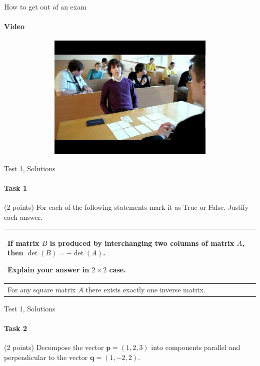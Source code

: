 \documentclass[aspectratio=169]{beamer}
\begin{document}
\begin{frame}[t]{How to get out of an exam}
    \framesubtitle{Video}
    \vspace{-0.6cm}
    \begin{figure}[H]
        \href{https://youtu.be/eiLF4zRA634}{
            \centering\includegraphics[height=6cm,width=1\textwidth,keepaspectratio]{meme.jpg}}
        \label{fig:meme.jpg}
    \end{figure}
\end{frame}

\begin{frame}[t]{Test 1, Solutions}
\framesubtitle{Task 1}
(2 points) For each of the following statements mark it as True or False. Justify each answer.
\smallskip


\begin{enumerate}

\begin{tabular}[b]{p{10cm}|p{2cm}}

\hline
   \item  If matrix $B$ is produced by interchanging two columns of matrix $A$, then $\det (B) = -\det (A) $. 
   
   Explain your answer in $2\times 2$ case. &    \\ 
    \hline
    \item For any square matrix $A$ there exists exactly one inverse matrix. & \\
    \hline
    \end{tabular}
\end{enumerate}
\end{frame}

\begin{frame}[t]{Test 1, Solutions}
\framesubtitle{Task 2}
(2 points) Decompose the vector $\textbf{p} = (1, 2, 3)$ into components parallel and perpendicular to the vector $\textbf{q} = (1, -2, 2)$.
\end{frame}
\end{document}
